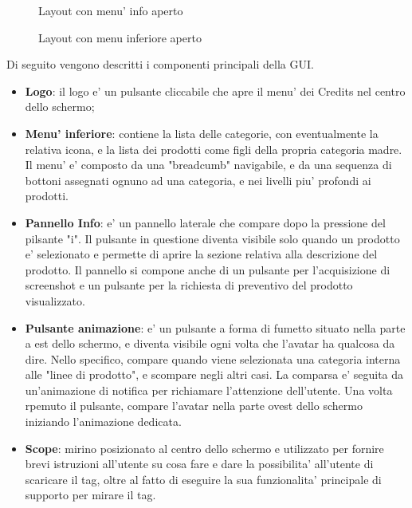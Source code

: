 \begin{figure}[H]
	\centering
	\caption{Layout con menu' info aperto}
	\label{fig:Layout con menu' info aperto}
\end{figure}

\begin{figure}[H]
	\centering
	\caption{Layout con menu inferiore aperto}
	\label{fig:Layout con menu inferiore aperto}
\end{figure}
\newpage
Di seguito vengono descritti i componenti principali della GUI.

\begin{itemize}
	\item \textbf{Logo}: il logo e' un pulsante cliccabile che apre il menu' dei Credits nel centro dello schermo;
	\item \textbf{Menu' inferiore}: contiene la lista delle categorie, con eventualmente la relativa icona, e la lista dei prodotti come figli della propria categoria madre. Il menu' e' composto da una "breadcumb" navigabile, e da una sequenza di bottoni assegnati ognuno ad una categoria, e nei livelli piu' profondi ai prodotti.
	\item \textbf{Pannello Info}: e' un pannello laterale che compare dopo la pressione del pilsante "i". Il pulsante in questione diventa visibile solo quando un prodotto e' selezionato e permette di aprire la sezione relativa alla descrizione del prodotto. Il pannello si compone anche di un pulsante per l'acquisizione di screenshot e un pulsante per la richiesta di preventivo del prodotto visualizzato.
	\item \textbf{Pulsante animazione}: e' un pulsante a forma di fumetto situato nella parte a est dello schermo, e diventa visibile ogni volta che l'avatar ha qualcosa da dire. Nello specifico, compare quando viene selezionata una categoria interna alle "linee di prodotto", e scompare negli altri casi. La comparsa e' seguita da un'animazione di notifica per richiamare l'attenzione dell'utente. Una volta rpemuto il pulsante, compare l'avatar nella parte ovest dello schermo iniziando l'animazione dedicata.
	\item \textbf{Scope}: mirino posizionato al centro dello schermo e utilizzato per fornire brevi istruzioni all'utente su cosa fare e dare la possibilita' all'utente di scaricare il tag, oltre al fatto di eseguire la sua funzionalita' principale di supporto per mirare il tag.
\end{itemize}

